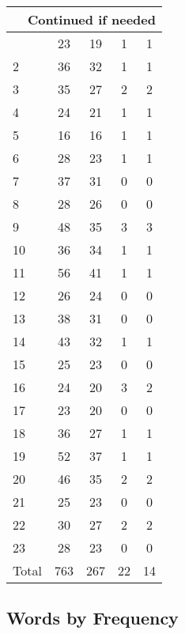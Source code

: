 \begin{center}
\begin{longtable}{l|c|c|c|c}
\hline \multicolumn{5}{|r|}{{Continued if needed}} \\ \hline
\endfoot 
1 & 23 & 19 & 1 & 1\\ \hline
2 & 36 & 32 & 1 & 1\\ \hline
3 & 35 & 27 & 2 & 2\\ \hline
4 & 24 & 21 & 1 & 1\\ \hline
5 & 16 & 16 & 1 & 1\\ \hline
6 & 28 & 23 & 1 & 1\\ \hline
7 & 37 & 31 & 0 & 0\\ \hline
8 & 28 & 26 & 0 & 0\\ \hline
9 & 48 & 35 & 3 & 3\\ \hline
10 & 36 & 34 & 1 & 1\\ \hline
11 & 56 & 41 & 1 & 1\\ \hline
12 & 26 & 24 & 0 & 0\\ \hline
13 & 38 & 31 & 0 & 0\\ \hline
14 & 43 & 32 & 1 & 1\\ \hline
15 & 25 & 23 & 0 & 0\\ \hline
16 & 24 & 20 & 3 & 2\\ \hline
17 & 23 & 20 & 0 & 0\\ \hline
18 & 36 & 27 & 1 & 1\\ \hline
19 & 52 & 37 & 1 & 1\\ \hline
20 & 46 & 35 & 2 & 2\\ \hline
21 & 25 & 23 & 0 & 0\\ \hline
22 & 30 & 27 & 2 & 2\\ \hline
23 & 28 & 23 & 0 & 0\\ \hline
\hline \hline
Total & 763 & 267 & 22 & 14



\end{longtable}
\end{center}

 
\subsection{Words by Frequency}


